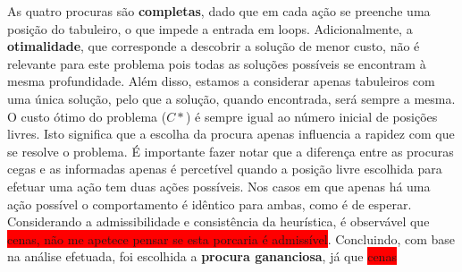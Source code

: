 \documentclass[12pt,a4paper]{article}
\begin{document}
As quatro procuras são \textbf{completas}, dado que em cada ação se preenche uma posição do tabuleiro,
o que impede a entrada em loops.
Adicionalmente, a \textbf{otimalidade}, que corresponde a descobrir a solução de menor custo,
não é relevante para este problema pois todas as soluções possíveis se encontram à mesma profundidade.
Além disso, estamos a considerar apenas tabuleiros com uma única solução,
pelo que a solução, quando encontrada, será sempre a mesma.
O custo ótimo do problema (\(C*\)) é sempre igual ao número inicial de posições livres.
Isto significa que a escolha da procura apenas influencia a rapidez com que se resolve o problema.
É importante fazer notar que a diferença entre as procuras cegas e as informadas
apenas é percetível quando a posição livre escolhida para efetuar uma ação tem duas ações possíveis.
Nos casos em que apenas há uma ação possível o comportamento é idêntico para ambas, como é de esperar.
Considerando a admissibilidade e consistência da heurística, é observável que
\colorbox{red}{cenas, não me apetece pensar se esta porcaria é admissível}.
Concluindo, com base na análise efetuada, foi escolhida a \textbf{procura gananciosa}, já que
\colorbox{red}{cenas}
\end{document}

